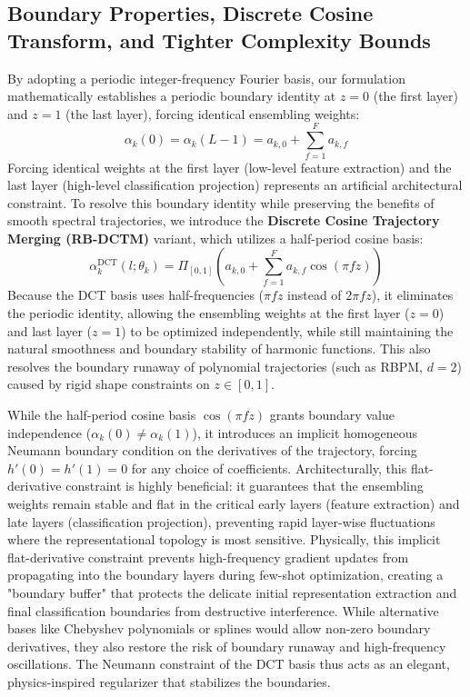 \subsection{Boundary Properties, Discrete Cosine Transform, and Tighter Complexity Bounds}
By adopting a periodic integer-frequency Fourier basis, our formulation mathematically establishes a periodic boundary identity at $z = 0$ (the first layer) and $z = 1$ (the last layer), forcing identical ensembling weights:
\begin{equation}
    \alpha_k(0) = \alpha_k(L-1) = a_{k,0} + \sum_{f=1}^F a_{k,f}
\end{equation}
Forcing identical weights at the first layer (low-level feature extraction) and the last layer (high-level classification projection) represents an artificial architectural constraint. To resolve this boundary identity while preserving the benefits of smooth spectral trajectories, we introduce the \textbf{Discrete Cosine Trajectory Merging (RB-DCTM)} variant, which utilizes a half-period cosine basis:
\begin{equation}
    \alpha^{\text{DCT}}_k(l; \theta_k) = \Pi_{[0,1]} \left( a_{k,0} + \sum_{f=1}^F a_{k,f} \cos\left(\pi f z\right) \right)
\end{equation}
Because the DCT basis uses half-frequencies ($\pi f z$ instead of $2\pi f z$), it eliminates the periodic identity, allowing the ensembling weights at the first layer ($z=0$) and last layer ($z=1$) to be optimized independently, while still maintaining the natural smoothness and boundary stability of harmonic functions. This also resolves the boundary runaway of polynomial trajectories (such as RBPM, $d=2$) caused by rigid shape constraints on $z \in [0, 1]$.

\begin{remark}
While the half-period cosine basis $\cos(\pi f z)$ grants boundary value independence ($\alpha_k(0) \neq \alpha_k(1)$), it introduces an implicit homogeneous Neumann boundary condition on the derivatives of the trajectory, forcing $h'(0) = h'(1) = 0$ for any choice of coefficients. Architecturally, this flat-derivative constraint is highly beneficial: it guarantees that the ensembling weights remain stable and flat in the critical early layers (feature extraction) and late layers (classification projection), preventing rapid layer-wise fluctuations where the representational topology is most sensitive. Physically, this implicit flat-derivative constraint prevents high-frequency gradient updates from propagating into the boundary layers during few-shot optimization, creating a "boundary buffer" that protects the delicate initial representation extraction and final classification boundaries from destructive interference. While alternative bases like Chebyshev polynomials or splines would allow non-zero boundary derivatives, they also restore the risk of boundary runaway and high-frequency oscillations. The Neumann constraint of the DCT basis thus acts as an elegant, physics-inspired regularizer that stabilizes the boundaries.
\end{remark}

